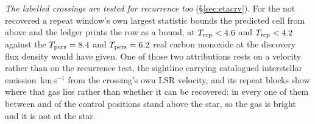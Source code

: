 \emph{The labelled crossings are tested for recurrence too}
(\S\ref{sec:etacrv}). For the \MkAttrExcl{} not recovered a repeat window's
own largest statistic bounds the predicted cell from above and the ledger
prints the row as a bound, at $T_{\rm rep}<4.6$ and
$T_{\rm rep}<4.2$ against the $T_{\rm pers}=8.4$ and
$T_{\rm pers}=6.2$ real carbon monoxide at the discovery flux density
would have given. One of those two attributions rests on a velocity rather
than on the recurrence test, the sightline carrying catalogued interstellar
emission \LsLupDv\,km\,s$^{-1}$ from the crossing's own LSR velocity, and its
repeat blocks show where that gas lies rather than whether it can be
recovered: in every one of them between \RqAjNgeLo{} and \RqAjNgeHi{} of the
\NCtrl{} control positions stand above the star, so the gas is bright and it
is not at the star.
